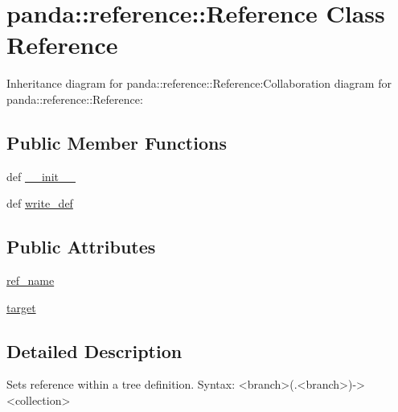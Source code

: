 \hypertarget{classpanda_1_1reference_1_1Reference}{
\section{panda::reference::Reference Class Reference}
\label{classpanda_1_1reference_1_1Reference}
}
Inheritance diagram for panda::reference::Reference:Collaboration diagram for panda::reference::Reference:\subsection*{Public Member Functions}
\begin{DoxyCompactItemize}
\item 
def \hyperlink{classpanda_1_1reference_1_1Reference_a9dc64a390eba2fd603865e85652d12fd}{\_\-\_\-init\_\-\_\-}
\item 
def \hyperlink{classpanda_1_1reference_1_1Reference_a8ca4bf3bf59ee8e694fc91d50a114a50}{write\_\-def}
\end{DoxyCompactItemize}
\subsection*{Public Attributes}
\begin{DoxyCompactItemize}
\item 
\hyperlink{classpanda_1_1reference_1_1Reference_a3408890dda5270567a142feb2e00eeda}{ref\_\-name}
\item 
\hyperlink{classpanda_1_1reference_1_1Reference_a0883ec7ce69e8db3153a91be0b1c2abf}{target}
\end{DoxyCompactItemize}


\subsection{Detailed Description}
\begin{DoxyVerb}
Sets reference within a tree definition. Syntax:
<branch>(.<branch>)-><collection>
\end{DoxyVerb}
 

